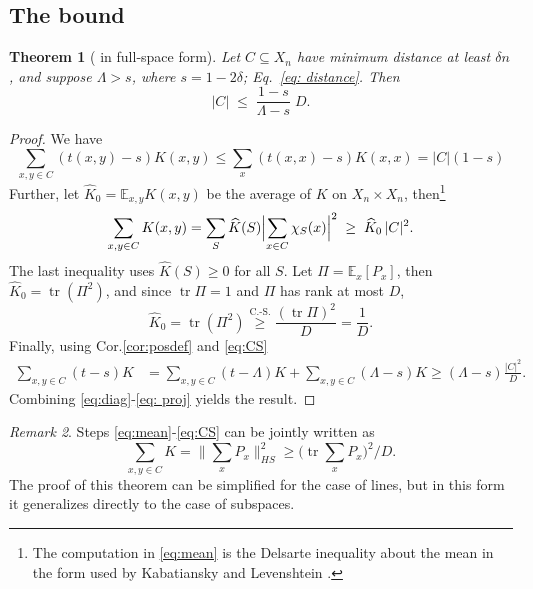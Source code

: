 \documentclass[11pt]{amsart}
\theoremstyle{plain}
\newtheorem{theorem}{Theorem}[section]
\theoremstyle{remark}
\newtheorem{remark}[theorem]{Remark}
\newcommand{\E}{\mathbb{E}}
\newcommand{\tr}{\operatorname{tr}}
\begin{document}
\subsection{The bound}

\begin{theorem}[\cite{BN06} in full-space form]\label{thm:bn06}
Let $C\subseteq X_n$ have minimum distance at least $\delta n$, and suppose
$\Lambda>s$, where $s=1-2\delta$; Eq.~\eqref{eq: distance}. Then
\[
 |C|\;\le\;\frac{1-s}{\Lambda-s}\;D .
\]
\end{theorem}

\begin{proof}
We have
  \begin{equation}\label{eq:diag}
  \sum_{x,y\in C}(t(x,y)-s)K(x,y)\le \sum_x(t(x,x)-s)K(x,x)=|C|(1-s)
  \end{equation}
Further, let $\widehat K_0= \E_{x,y}K(x,y)$ be the average of $K$ on $X_n\times X_n$, then\footnote{The computation in \eqref{eq:mean} is the Delsarte inequality about the mean in the form
used by Kabatiansky and Levenshtein \cite{KabatyanskiiLevenshtein1978}.}
  \begin{equation}\label{eq:mean}
 \sum_{x,y\in C}K(x,y)
 =\sum_{S}\widehat K(S)\Bigl|\sum_{x\in C}\chi_S(x)\Bigr|^{2}
 \;\ge\;\widehat K_0\,|C|^{2}.
\end{equation}
The last inequality uses $\hat K(S)\ge 0$ for all $S$.
Let $\Pi=\E_x[P_x]$, then 
$\widehat K_0=\tr(\Pi^2)$, and since $\tr\Pi=1$ and $\Pi$ has rank at most
$D$,
\begin{equation}\label{eq:CS}
 \widehat K_0=\tr(\Pi^{2})\stackrel{\text{C.-S.}}{\ge}\frac{(\tr\Pi)^{2}}{D}=\frac1D .
\end{equation}
Finally, using Cor.\ref{cor:posdef} and \eqref{eq:CS}
    \begin{align}\label{eq: proj}
    \sum_{x,y\in C}(t-s)K&=\sum_{x,y\in C}(t-\Lambda)K+\sum_{x,y\in C}(\Lambda-s)K 
    \ge (\Lambda-s)\frac {|C|^2}D.
    \end{align}
Combining \eqref{eq:diag}-\eqref{eq: proj} yields the result.
\end{proof}
\begin{remark}
Steps \eqref{eq:mean}-\eqref{eq:CS} can be jointly written as
  \begin{equation}\label{eq: two steps}
   \sum_{x,y\in C}K=\|\sum_xP_x\|_{HS}^2\ge\Big(\tr\sum_xP_x\Big)^2/D.
   \end{equation}
The proof of this theorem can be simplified for the case of lines, but in this form it generalizes directly to the case of subspaces.    
\end{remark}
\end{document}
